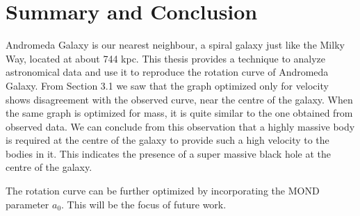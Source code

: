 \chapter{Summary and Conclusion}

Andromeda Galaxy is our nearest neighbour, a spiral galaxy just like the Milky Way, located at about 744 kpc. This thesis provides a technique to analyze astronomical data and use it to reproduce the rotation curve of Andromeda Galaxy. From Section 3.1 we saw that the graph optimized only  for velocity shows disagreement with the observed curve, near the centre of the galaxy. When the same graph is optimized for mass, it is quite similar to the one obtained from observed data. We can conclude from this observation that a highly massive body is required at the centre of the galaxy to provide such a high velocity to the bodies in it. This indicates the presence of a super massive black hole at the centre of the galaxy. 

The rotation curve can be further optimized by incorporating the MOND parameter $a_0$. This will be the focus of future work.